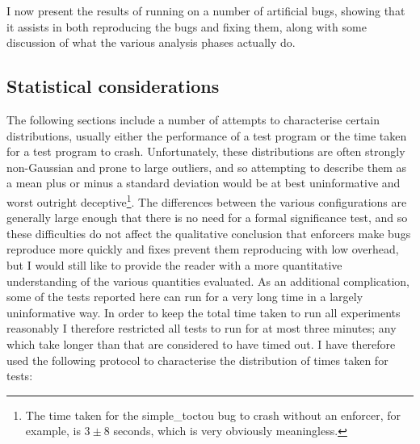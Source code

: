 I now present the results of running {\implementation} on a number of
artificial bugs, showing that it assists in both reproducing the bugs
and fixing them, along with some discussion of what the various
analysis phases actually do.

\subsection{Statistical considerations}

The following sections include a number of attempts to characterise
certain distributions, usually either the performance of a test
program or the time taken for a test program to crash.  Unfortunately,
these distributions are often strongly non-Gaussian and prone to large
outliers, and so attempting to describe them as a mean plus or minus a
standard deviation would be at best uninformative and worst outright
deceptive\footnote{The time taken for the simple\_toctou bug to crash
  without an enforcer, for example, is $3 \pm 8$ seconds, which is
  very obviously meaningless.}.  The differences between the various
configurations are generally large enough that there is no need for a
formal significance test, and so these difficulties do not affect the
qualitative conclusion that enforcers make bugs reproduce more quickly
and fixes prevent them reproducing with low overhead, but I would
still like to provide the reader with a more quantitative
understanding of the various quantities evaluated.  As an additional
complication, some of the tests reported here can run for a very long
time in a largely uninformative way.  In order to keep the total time
taken to run all experiments reasonably I therefore restricted all
tests to run for at most three minutes; any which take longer than
that are considered to have timed out.  I have therefore used the
following protocol to characterise the distribution of times taken for
tests:

